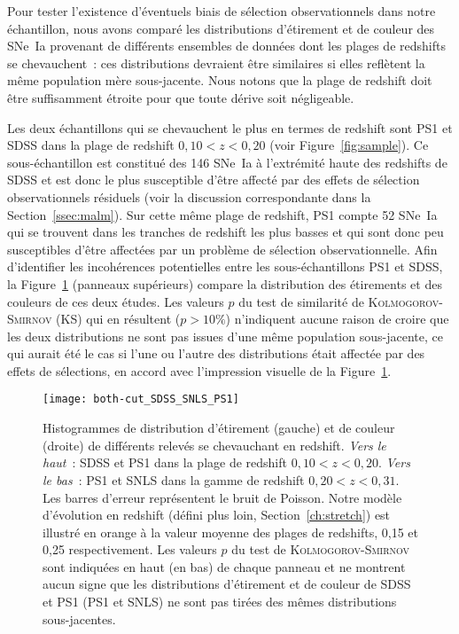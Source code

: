 \documentclass[../main/main.tex]{subfiles}
\begin{document}
Pour tester l'existence d'éventuels biais de sélection observationnels dans
notre échantillon, nous avons comparé les distributions d'étirement et de couleur
des SNe~Ia provenant de différents ensembles de données dont les plages de
redshifts se chevauchent~: ces distributions devraient être similaires si elles
reflètent la même population mère sous-jacente. Nous notons que la plage de
redshift doit être suffisamment étroite pour que toute dérive soit négligeable.

Les deux échantillons qui se chevauchent le plus en termes de redshift sont PS1
et SDSS dans la plage de redshift $0,10 < z < 0,20$ (voir
Figure~\ref{fig:sample}). Ce sous-échantillon est constitué des 146 SNe~Ia à
l'extrémité haute des redshifts de SDSS et est donc le plus susceptible d'être
affecté par des effets de sélection observationnels résiduels (voir la
discussion correspondante dans la Section~\ref{ssec:malm}). Sur cette même plage
de redshift, PS1 compte 52 SNe~Ia qui se trouvent dans les tranches de redshift
les plus basses et qui sont donc peu susceptibles d'être affectées par un
problème de sélection observationnelle. Afin d'identifier les incohérences
potentielles entre les sous-échantillons PS1 et SDSS, la Figure~\ref{fig:testvl}
(panneaux supérieurs) compare la distribution des étirements et des couleurs de
ces deux études. Les valeurs $p$ du test de similarité de
\textsc{Kolmogorov-Smirnov} (KS) qui en résultent ($p > 10\%$) n'indiquent
aucune raison de croire que les deux distributions ne sont pas issues d'une même
population sous-jacente, ce qui aurait été le cas si l'une ou l'autre des
distributions était affectée par des effets de sélections, en accord avec
l'impression visuelle de la Figure~\ref{fig:testvl}.

\begin{figure}[ht]
    \centering
    \texttt{[image: both-cut\_SDSS\_SNLS\_PS1]}
    \caption[Histogrammes de test de similarité de \textsc{Kolmogorov-Smirnov}
    entre les sondages SDSS et PS1 d'une part, PS1 et SNLS d'autre part, en
    étirement et en couleur]{Histogrammes de distribution d'étirement (gauche) et
        de couleur (droite) de différents relevés se chevauchant en redshift.
        \textit{Vers le haut}~: SDSS et PS1 dans la plage de redshift $0,10 < z
        < 0,20$. \textit{Vers le bas}~: PS1 et SNLS dans la gamme de redshift
        $0,20 < z < 0,31$. Les barres d'erreur représentent le bruit de Poisson.
        Notre modèle d'évolution en redshift (défini plus loin,
        Section~\ref{ch:stretch}) est illustré en orange à la valeur moyenne des
        plages de redshifts, 0,15 et 0,25 respectivement. Les valeurs $p$ du
        test de \textsc{Kolmogorov-Smirnov} sont indiquées en haut (en bas) de
        chaque panneau et ne montrent aucun signe que les distributions
        d'étirement et de couleur de SDSS et PS1 (PS1 et SNLS) ne sont pas
    tirées des mêmes distributions sous-jacentes.}
    \label{fig:testvl}
\end{figure}
\end{document}
